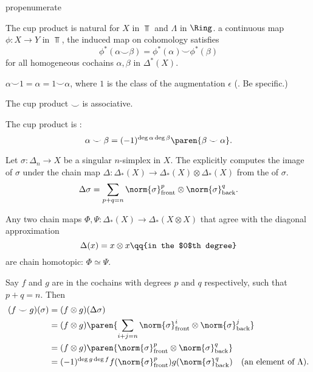 \begin{comp}{prop}{enumerate}
    \item The cup product is natural for $X$ in $\Top$ and $\Lambda$ in $\Ring$. \Lambdaiven a continuous map $\phi \colon X \to Y$ in $\Top$, the induced map on cohomology satisfies 
       \[
       \phi^*(\alpha \smile \beta) = \phi^*(\alpha) \smile \phi^*(\beta)
       \]
       for all homogeneous cochains $\alpha, \beta$ in $\Delta^*(X)$.
    \item $\alpha \smile 1 = \alpha = 1 \smile \alpha$, where $1$ is the class of the augmentation $\epsilon$ (\TODO. Be specific.)
    \item The cup product $\smile$ is associative.
    \item The cup product is :
       \[\alpha \smile \beta = (-1)^{\deg \alpha \deg \beta} \paren{ \beta \smile \alpha }. \] 
\end{comp}

\begin{defn}
   Let $\sigma \colon \Delta_n \to X$ be a singular $n$-simplex in $X$. The  explicitly computes the image of $\sigma$ under the chain map $\Delta \colon \Delta_*(X) \to \Delta_*(X) \otimes \Delta_*(X)$ from the  of $\sigma$.
   \[
       \Delta \sigma  = \sum_{p + q = n} \norm{ \sigma }_\text{front}^p \otimes \norm{ \sigma }_\text{back}^q
   .\]
\end{defn}

\begin{todo}
   Any two chain maps $\Phi, \Psi \colon \Delta_*(X) \to \Delta_*(X\otimes X)$ that agree with the diagonal approximation
    \[
        \Delta(x) = x \otimes x \qq{in the $0$th degree}
    \]
    are chain homotopic: $\Phi \simeq \Psi$.
\end{todo}

\begin{prop}
    Say $f$ and $g$ are in the cochains with degrees $p$ and $q$ respectively, such that $p+q = n$. Then
    \begin{align*}
        (f \smile g)(\sigma) &= (f \otimes g)(\Delta\sigma)\\
                           &= (f \otimes g) \paren{\sum_{i+j = n} \norm{ \sigma }_\text{front}^i \otimes \norm{ \sigma }_\text{back}^j} \\
                           &= (f \otimes g) \paren{ \norm{ \sigma }_\text{front}^p \otimes \norm{ \sigma }_\text{back}^q}  \\
                           & = (-1)^{\deg g \deg f} f(  \norm{ \sigma }_\text{front}^p ) g(\norm{ \sigma }_\text{back}^q) \quad (\text{an element of } \Lambda).
    \end{align*}
\end{prop}

